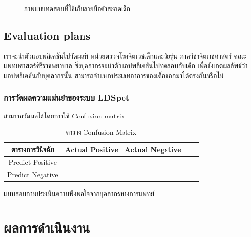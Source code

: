 \documentclass[12pt,oneside,openright,a4paper]{cpe-thai-project}
\begin{document}
\begin{figure}[!ht]\centering
  \setlength{\fboxrule}{0.2mm} %
  \setlength{\fboxsep}{1cm}
  \caption{ภาพแบบทดสอบที่ใช้เก็บลายมือคำสะกดเด็ก}\label{fig:system}
    
\end{figure}

\newpage
\section{Evaluation plans}
เราจะนำตัวแอปพลิเคชันไปวัดผลที่ หน่วยตรวจโรคจิตเวชเด็กและวัยรุ่น ภาควิชาจิตเวชศาสตร์ คณะแพทยศาสตร์ศิริราชพยาบาล  ซึ่งบุคลากรจะนำตัวแอปพลิเคชันไปทดสอบกับเด็ก เพื่อสังเกตผลลัพธ์ว่า แอปพลิเคชันกับบุคลากรนั้น สามารถจำแนกประเภทอาการของเด็กออกมาได้ตรงกันหรือไม่ 
\subsection{การวัดผลความแม่นยำของระบบ LDSpot}
สามารถวัดผลได้โดยการใช้ Confusion matrix 

\begin{table}[!h]\centering
  \caption{ตาราง Confusion Matrix}\label{tbl:confusion}
  \begin{tabular}{c|c|l|rr} \hline
  ตารางการวินิจฉัย & Actual Positive & Actual Negative \\ \hline
  Predict Positive & & \\ \hline
  Predict Negative & & \\ \hline
  \end{tabular}
  \end{table}


แบบสอบถามประเมินความพึงพอใจจากบุคลากรทางการแพทย์

\chapter{ผลการดำเนินงาน}
\end{document}
